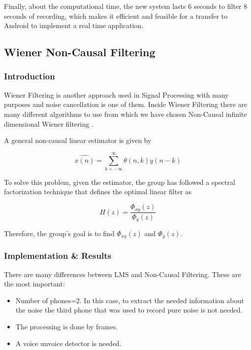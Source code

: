 \documentclass[11pt,a4paper,english]{book}  %
\theoremstyle{definition}  %
\theoremstyle{plain}  %
\theoremstyle{remark}  %
\begin{document}
Finally, about the computational time, the new system lasts 6 seconds to filter 8 seconds of recording, which makes it efficient and feasible for a transfer to Android to implement a real time application.

	\subsection{Wiener Non-Causal Filtering}
	
	\subsubsection{Introduction}
	
	
	Wiener Filtering is another approach used in Signal Processing with many purposes and noise cancellation is one of them. Inside Wiener Filtering there are many different algorithms to use from which we have chosen Non-Causal infinite dimensional Wiener filtering \cite{asp}.
	
	A general non-causal linear estimator is given by 
	
	
	\begin{equation}
	\label{eq:nonc1}
		\hat{x(n)} = \sum \limits_{k=-\infty}^\infty \theta(n,k)y(n-k)
	\end{equation}
	
	To solve this problem, given the estimator, the group has followed a spectral factorization technique that defines the optimal linear filter as
	
		\begin{equation}
	\label{eq:nonc1}
		H(z)=\frac{\Phi_{xy}(z)}{\Phi_{y}(z)}
	\end{equation}
	
	Therefore, the group's goal is to find $\Phi_{xy}(z)$ and $\Phi_{y}(z)$.
	
	
	\subsubsection{Implementation \& Results}
	
		There are many differences between LMS and Non-Causal Filtering. These are the most important:
		
		\begin{itemize}
		\item Number of phones=2. In this case, to extract the needed information about the noise the third phone that was used to record pure noise is not needed. 
		
		\item The processing is done by frames.
		
		\item A voice unvoice detector is needed.
		\end{itemize}
		
\end{document}
